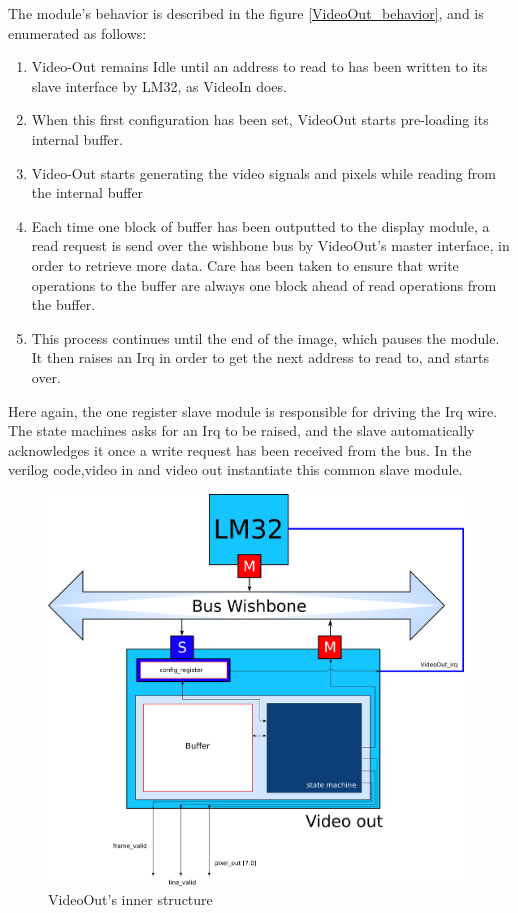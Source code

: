 The module's behavior is described in the figure \ref{VideoOut_behavior}, and is enumerated as follows:
\begin{enumerate}
\item Video-Out remains Idle until an address to read to has been written to its slave interface by LM32, as VideoIn does.
\item When this first configuration has been set, VideoOut starts pre-loading its internal buffer.
\item Video-Out starts generating the video signals and pixels while reading from the internal buffer 
\item Each time one block of buffer has been outputted to the display module, a read request is send over the wishbone bus by VideoOut's master interface, in order to retrieve more data. Care has been taken to ensure that write operations to the buffer are always one block ahead of read operations from the buffer.
\item This process continues until the end of the image, which pauses the module. It then raises an Irq in order to get the next address to read to, and starts over.
\end{enumerate}

Here again, the one register slave module is responsible for driving the Irq wire.
The state machines asks for an Irq to be raised, and the slave automatically acknowledges it once a write request has been received from the bus. In the verilog code,video in and video out instantiate this common slave module.

\vfill
\begin{figure}[h]
\center
\includegraphics[width=11cm]{figs/Video_Out_blocks.pdf}
\caption{VideoOut's inner structure}
\label{VideoOut_struct}
\end{figure}
\vfill

